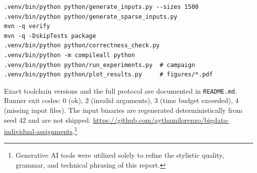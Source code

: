 \documentclass[11pt,a4paper]{article}
\begin{document}
\begin{verbatim}
.venv/bin/python python/generate_inputs.py --sizes 1500
.venv/bin/python python/generate_sparse_inputs.py
mvn -q verify
mvn -q -DskipTests package
.venv/bin/python python/correctness_check.py
.venv/bin/python -m compileall python
.venv/bin/python python/run_experiments.py  # campaign
.venv/bin/python python/plot_results.py     # figures/*.pdf
\end{verbatim}

Exact toolchain versions and the full protocol are documented in
\texttt{README.md}. Runner exit codes: 0 (ok), 2 (invalid arguments), 3
(time budget exceeded), 4 (missing input files). The input binaries are
regenerated deterministically from seed 42 and are not shipped.
\url{https://github.com/aythamilorenzo/bigdata-individual-assignments}.\footnote{Generative AI
tools were utilized solely to refine the stylistic quality, grammar, and
technical phrasing of this report.}
\end{document}
